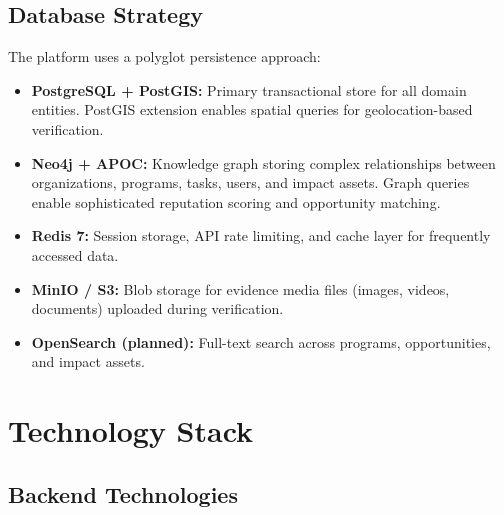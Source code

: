 \documentclass[11pt,a4paper]{article}
\begin{document}
\subsection{Database Strategy}

The platform uses a polyglot persistence approach:

\begin{itemize}
  \item \textbf{PostgreSQL + PostGIS:} Primary transactional store for all domain entities. PostGIS extension enables spatial queries for geolocation-based verification.
  \item \textbf{Neo4j + APOC:} Knowledge graph storing complex relationships between organizations, programs, tasks, users, and impact assets. Graph queries enable sophisticated reputation scoring and opportunity matching.
  \item \textbf{Redis 7:} Session storage, API rate limiting, and cache layer for frequently accessed data.
  \item \textbf{MinIO / S3:} Blob storage for evidence media files (images, videos, documents) uploaded during verification.
  \item \textbf{OpenSearch (planned):} Full-text search across programs, opportunities, and impact assets.
\end{itemize}

\clearpage

\section{Technology Stack}

\subsection{Backend Technologies}
\end{document}
